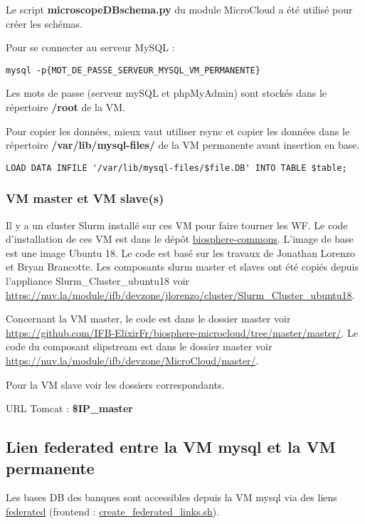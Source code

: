 Le script \textbf{microscopeDBschema.py} du module MicroCloud a été utilisé pour créer les schémas.
\newline

Pour se connecter au serveur MySQL :
\begin{lstlisting}[style=bash]
mysql -p{MOT_DE_PASSE_SERVEUR_MYSQL_VM_PERMANENTE}
\end{lstlisting}

Les mots de passe (serveur mySQL et phpMyAdmin) sont stockés dans le répertoire \textbf{/root} de la VM.
\newline 

Pour copier les données, mieux vaut utiliser rsync et copier les données dans le répertoire \textbf{/var/lib/mysql-files/} de la VM permanente avant insertion en base.

\begin{lstlisting}[style=bash]
LOAD DATA INFILE '/var/lib/mysql-files/$file.DB' INTO TABLE $table;
\end{lstlisting}

\subsubsection{VM master et VM slave(s)} \label{master&slave}

Il y a un cluster Slurm installé sur ces VM pour faire tourner les WF. Le code d’installation de ces VM est dans le dépôt \href{https://github.com/IFB-ElixirFr/biosphere-commons}{biosphere-commons}.
L'image de base est une image Ubuntu 18.
Le code est basé sur les travaux de Jonathan Lorenzo et Bryan Brancotte.
Les composants slurm master et slaves ont été copiés depuis l'appliance Slurm\_Cluster\_ubuntu18 voir \url{https://nuv.la/module/ifb/devzone/jlorenzo/cluster/Slurm_Cluster_ubuntu18}.

Concernant la VM master, le code est dans le dossier master voir
\url{https://github.com/IFB-ElixirFr/biosphere-microcloud/tree/master/master/}.
Le code du composant slipstream est dans le dossier master voir \url{https://nuv.la/module/ifb/devzone/MicroCloud/master/}.

Pour la VM slave voir les dossiers correspondants.\newline

URL Tomcat : \textbf{\$IP\_master}

\subsection{Lien federated entre la VM mysql et  la VM permanente}
Les bases DB des banques sont accessibles depuis la VM mysql via des liens \href{https://dev.mysql.com/doc/refman/8.0/en/federated-storage-engine.html}{federated} (frontend : \href{https://github.com/IFB-ElixirFr/biosphere-microcloud/blob/master/frontend/create_federated_links.sh}{create\_federated\_links.sh}).\\

